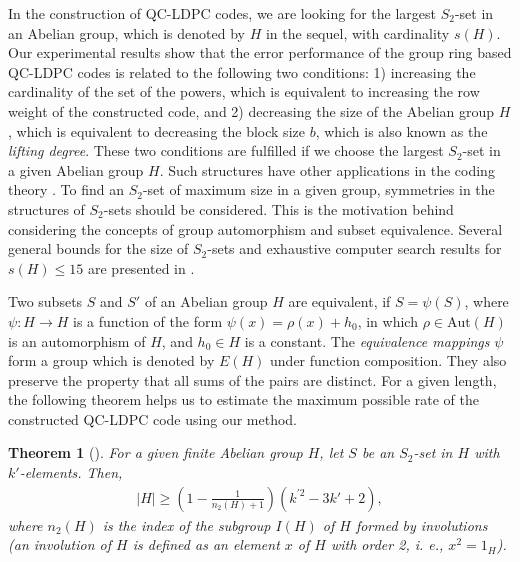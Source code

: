 \documentclass[journal,draftclsnofoot,onecolumn,12pt,twoside]{IEEEtran}
\newtheorem{theorem}{Theorem}
\begin{document}
In the construction of QC-LDPC codes, we are looking for the largest $S_2$-set in an Abelian group, which is denoted by $H$ in the sequel, with cardinality $s(H)$. Our experimental results show that the error performance of the group ring based QC-LDPC codes is related to the following two conditions: 1) increasing the cardinality of the set of the powers, which is equivalent to increasing the row weight of the constructed code, and 2) decreasing the size of the Abelian group $H$, which is equivalent to decreasing the block size $b$, which is also known as the \emph{lifting degree}. These two conditions are fulfilled  if we choose  the largest $S_2$-set in a given Abelian group $H$. Such structures have other applications in the coding theory \cite{26,27,28}. To find an $S_2$-set of maximum size in a given group, symmetries in the structures of $S_2$-sets should be considered. This is the motivation behind considering the concepts of group automorphism and subset equivalence. Several general bounds for the size of $S_2$-sets and  exhaustive computer search results for $s(H)\leq 15$ are presented in \cite{18,19}.

Two subsets $S$ and $S'$ of an Abelian group $H$ are equivalent, if $S = \psi(S)$, where $\psi :H\rightarrow H$ is a function of the form $\psi(x) = \rho(x) + h_0$, in which $\rho \in \mathrm{Aut}(H)$ is an automorphism of $H$, and $h_0 \in H$ is a constant. The \emph{equivalence mappings} $\psi$ form a group which is denoted by $E(H)$ under function composition. They also preserve the property that all sums of the pairs are
distinct.  For a given length, the following theorem helps us to estimate the maximum possible rate of the constructed QC-LDPC code using our method.
\begin{theorem} [\emph{\cite[Theorem 2]{19}}]\label{theorem7}
For a given finite Abelian group $H$, let $S$ be an $S_2$-set in $H$ with $k'$-elements. Then,
\begin{eqnarray}
|H|\geq \left(1- \frac{1}{n_2(H)+1} \right)(k^{\prime 2}-3k'+2),
\end{eqnarray}
where $n_2(H)$ is the index of the subgroup $I(H)$ of $H$ formed by involutions (an involution of $H$ is defined as an element $x$ of $H$ with order 2, i. e., $x^2=1_H$).
\end{theorem}
\end{document}
